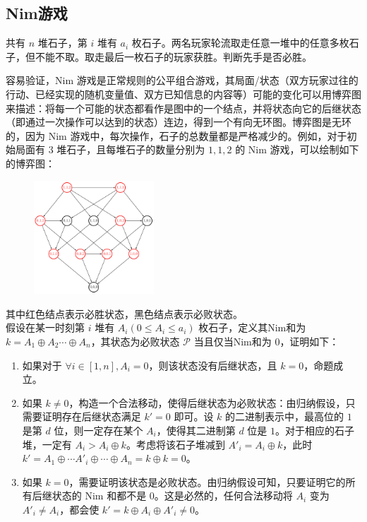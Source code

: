 \documentclass[12pt,a4paper]{article}
\begin{document}
\subsection{Nim游戏}
\begin{mdframed}[leftline=true, linewidth=2pt, linecolor=gray]
	共有 $n$ 堆石子，第 $i$ 堆有 $a_i$ 枚石子。两名玩家轮流取走任意一堆中的任意多枚石子，但不能不取。取走最后一枚石子的玩家获胜。判断先手是否必胜。
\end{mdframed}
容易验证，Nim 游戏是正常规则的公平组合游戏，其局面/状态（双方玩家过往的行动、已经实现的随机变量值、双方已知信息的内容等）可能的变化可以用博弈图来描述：将每一个可能的状态都看作是图中的一个结点，并将状态向它的后继状态（即通过一次操作可以达到的状态）连边，得到一个有向无环图。博弈图是无环的，因为 Nim 游戏中，每次操作，石子的总数量都是严格减少的。例如，对于初始局面有 $3$ 堆石子，且每堆石子的数量分别为 $1,1,2$ 的 Nim 游戏，可以绘制如下的博弈图：
\begin{figure}[H]
	\centering
	\includegraphics[width=0.4\textwidth]{game1.png}
\end{figure}
\noindent 其中红色结点表示必胜状态，黑色结点表示必败状态。\\
假设在某一时刻第 $i$ 堆有 $A_i(0\le A_i\le a_i)$ 枚石子，定义其Nim和为 $k=A_1\oplus A_2\cdots\oplus A_n$，其状态为必败状态 $\mathcal P$ 当且仅当Nim和为 $0$，证明如下：
\begin{enumerate}
	\item 如果对于 $\forall i\in[1,n],A_i=0$，则该状态没有后继状态，且 $k=0$，命题成立。
	\item 如果 $k\ne0$，构造一个合法移动，使得后继状态为必败状态：由归纳假设，只需要证明存在后继状态满足 $k'=0$ 即可。设 $k$ 的二进制表示中，最高位的 $1$ 是第 $d$ 位，则一定存在某个 $A_i$，使得其二进制第 $d$ 位是 $1$。对于相应的石子堆，一定有 $A_i>A_i\oplus k$。考虑将该石子堆减到 $A'_i=A_i\oplus k$，此时 $k'=A_1\oplus\cdots A'_i\oplus\cdots\oplus A_n=k\oplus k=0$。
	\item 如果 $k=0$，需要证明该状态是必败状态。由归纳假设可知，只要证明它的所有后继状态的 Nim 和都不是 $0$。这是必然的，任何合法移动将 $A_i$ 变为 $A'_i\neq A_i$，都会使 $k'=k\oplus A_i\oplus A'_i\ne0$。
\end{enumerate}
\end{document}
